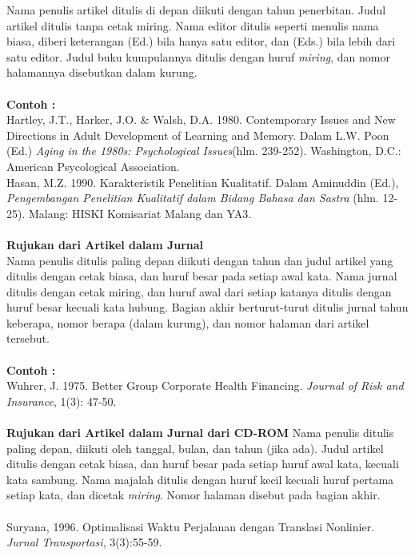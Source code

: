 Nama	penulis	artikel	ditulis	di	depan	diikuti	dengan	tahun	penerbitan.	Judul	artikel	ditulis	tanpa	 cetak	 miring.	 Nama	 editor	 ditulis	 seperti	 menulis	 nama	 biasa,	 diberi	 keterangan	(Ed.)	bila	hanya	satu	editor,	dan	(Eds.)	bila	lebih	dari	satu	editor.	Judul	buku	kumpulannya	ditulis	dengan	huruf \textit{miring}, dan	nomor	halamannya	disebutkan	dalam	kurung.\\
\\
\textbf{Contoh :}\\
Hartley,	 J.T.,	Harker,	 J.O.	\&	Walsh,	D.A.	1980. Contemporary	 Issues	and	New	Directions	in	Adult	 Development	 of	 Learning	 and	Memory.	 Dalam	 L.W.	 Poon	 (Ed.) \textit{Aging	in	 the	 1980s:	Psychological	Issues}(hlm.	239-252).	Washington,	D.C.:	American	Psycological	Association.\\
 Hasan,	 M.Z.	 1990.	 Karakteristik	 Penelitian	 Kualitatif.	 Dalam	 Aminuddin	 (Ed.),\\ \textit{Pengembangan	Penelitian	Kualitatif	dalam	Bidang	Bahasa	dan	Sastra} (hlm.	12-25).	Malang:	HISKI	Komisariat	Malang	dan	YA3.
 \\
 \\
 \textbf{Rujukan dari Artikel dalam Jurnal}\\
 Nama	 penulis	 ditulis	 paling	 depan	 diikuti	 dengan	 tahun	 dan	 judul	 artikel	 yang	 ditulis	dengan	 cetak	 biasa,	 dan	 huruf	 besar	 pada	 setiap	 awal	 kata.	 Nama	 jurnal	 ditulis	 dengan	cetak	miring,	 dan	 huruf	awal	 dari	 setiap	 katanya	 ditulis	 dengan	 huruf	 besar	 kecuali	 kata	hubung.	Bagian	akhir	berturut-turut		ditulis		jurnal	tahun	keberapa,	nomor	berapa	(dalam	kurung),	dan	nomor	halaman	dari	artikel	tersebut.\\
\\
\textbf{Contoh :}\\
Wuhrer,	 J.	 1975.	Better	Group	 Corporate	Health	 Financing.	\textit{Journal	 of	Risk	 and	 Insurance}, 1(3):	47-50.
\\
\\
\textbf{Rujukan dari Artikel dalam Jurnal dari CD-ROM}
Nama	penulis	ditulis	paling	depan,	diikuti	oleh	 tanggal,	bulan,	dan	 tahun	(jika	ada).	 Judul	artikel	ditulis	dengan	cetak	biasa,	dan	huruf	besar	pada	setiap	huruf	awal	kata,	kecuali	kata	
sambung.	Nama	majalah	ditulis	dengan	huruf	kecil	kecuali	huruf	pertama setiap	kata,	dan	dicetak \textit{miring}. Nomor	halaman	disebut	pada	bagian	akhir.
\\
\\Suryana,	 1996.	 Optimalisasi	 Waktu	 Perjalanan	 dengan	 Translasi	 Nonlinier. \textit{Jurnal	Transportasi},	3(3):55-59.
